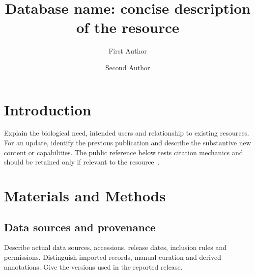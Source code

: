 \documentclass[unnumsec,webpdf,modern,large]{oup-authoring-template}
\begin{document}
\DOI{}
\copyrightyear{}
\pubyear{}

\title[Database name and short title]{Database name: concise description of the resource}
\author[1,$\ast$]{First Author}
\author[1,2]{Second Author}
\address[1]{, ,
  }
\address[2]{, ,
  }

\maketitle
\thispagestyle{plain}
\pagestyle{plain}

\section{Introduction}\label{sec:introduction}
Explain the biological need, intended users and relationship to existing
resources. For an update, identify the previous publication and describe
the substantive new content or capabilities. The public reference below
tests citation mechanics and should be retained only if relevant to the
resource~\cite{wilkinson2016fair}.

\section{Materials and Methods}\label{sec:methods}
\subsection{Data sources and provenance}
Describe actual data sources, accessions, release dates, inclusion rules
and permissions. Distinguish imported records, manual curation and
derived annotations. Give the versions used in the reported release.
\end{document}
